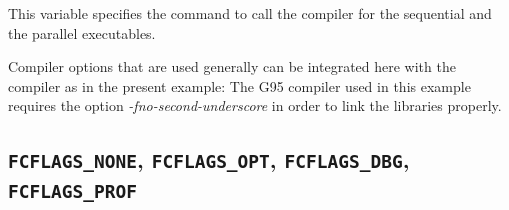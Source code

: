 \documentclass[a4paper,10pt]{report}
\newcommand{\mytt}[1]{{\tt #1}}
\begin{document}
This variable specifies the command to call the compiler for the
sequential and the parallel executables.

Compiler options that are used generally can be integrated here with
the compiler as in the present example: The G95 compiler used in this
example requires the option \textit{-fno-second-underscore} in order
to link the libraries properly.

\subsection{\mytt{FCFLAGS\_NONE}, \mytt{FCFLAGS\_OPT}, 
\mytt{FCFLAGS\_DBG}, \mytt{FCFLAGS\_PROF}}
\end{document}
